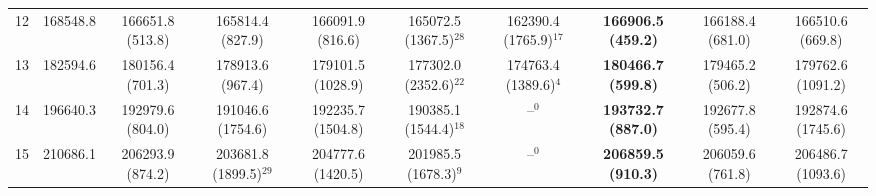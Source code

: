 \begin{table}[!t]
{\begin{tabular}{cccccccccc}
12 & 168548.8 & 166651.8 (513.8) & 165814.4 (827.9) & 166091.9 (816.6) & 165072.5 (1367.5)$^{28}$ & 162390.4 (1765.9)$^{17}$ & \textbf{166906.5 (459.2)} & 166188.4 (681.0) & 166510.6 (669.8) \\
13 & 182594.6 & 180156.4 (701.3) & 178913.6 (967.4) & 179101.5 (1028.9) & 177302.0 (2352.6)$^{22}$ & 174763.4 (1389.6)$^{4}$ & \textbf{180466.7 (599.8)} & 179465.2 (506.2) & 179762.6 (1091.2) \\
14 & 196640.3 & 192979.6 (804.0) & 191046.6 (1754.6) & 192235.7 (1504.8) & 190385.1 (1544.4)$^{18}$ & --$^{0}$ & \textbf{193732.7 (887.0)} & 192677.8 (595.4) & 192874.6 (1745.6) \\
15 & 210686.1 & 206293.9 (874.2) & 203681.8 (1899.5)$^{29}$ & 204777.6 (1420.5) & 201985.5 (1678.3)$^{9}$ & --$^{0}$ & \textbf{206859.5 (910.3)} & 206059.6 (761.8) & 206486.7 (1093.6) \\
\bottomrule
\end{tabular}}
\end{table}

